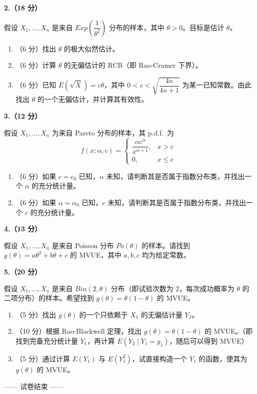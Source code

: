 \documentclass[12pt,a4paper]{ctexart}
\newcommand{\question}[1]{\bigskip\noindent\textbf{#1}\par\nobreak\medskip}
\begin{document}
\question{2.（18 分）}
假设 $X_{1},\ldots,X_{n}$ 是来自 $Exp\!\left(\dfrac{1}{\theta^{2}}\right)$ 分布的样本，其中 $\theta>0$。目标是估计 $\theta$。
\begin{enumerate}[label=(\arabic*),leftmargin=2.4em]
  \item （6 分）找出 $\theta$ 的极大似然估计。
  \item （6 分）计算 $\theta$ 的无偏估计的 RCB（即 Rao-Cramer 下界）。
  \item （6 分）已知 $E\!\left(\sqrt{\overline{X}}\right)=c\theta$，其中 $0<c<\sqrt{\dfrac{4n}{4n+1}}$ 为某一已知常数。由此找出 $\theta$ 的一个无偏估计，并计算其有效性。
\end{enumerate}

\question{3.（12 分）}
假设 $X_{1},\ldots,X_{n}$ 为来自 Pareto 分布的样本，其 p.d.f.\ 为
\[ f(x;\alpha,c)=\begin{cases} \dfrac{\alpha c^{\alpha}}{x^{\alpha+1}}, & x>c \\[2mm] 0, & x\le c \end{cases} \]
\begin{enumerate}[label=(\arabic*),leftmargin=2.4em]
  \item （6 分）如果 $c=c_{0}$ 已知，$\alpha$ 未知，请判断其是否属于指数分布类，并找出一个 $\alpha$ 的充分统计量。
  \item （6 分）如果 $\alpha=\alpha_{0}$ 已知，$c$ 未知，请判断其是否属于指数分布类，并找出一个 $c$ 的充分统计量。
\end{enumerate}

\question{4.（13 分）}
假设 $X_{1},\ldots,X_{n}$ 是来自 Poisson 分布 $Po(\theta)$ 的样本。请找到 $g(\theta)=a\theta^{2}+b\theta+c$ 的 MVUE，其中 $a,b,c$ 均为给定常数。

\question{5.（20 分）}
假设 $X_{1},\ldots,X_{n}$ 是来自 $Bin(2,\theta)$ 分布（即试验次数为 2，每次成功概率为 $\theta$ 的二项分布）的样本。希望找到 $g(\theta)=\theta(1-\theta)$ 的 MVUE。
\begin{enumerate}[label=(\arabic*),leftmargin=2.4em]
  \item （5 分）找出 $g(\theta)$ 的一个只依赖于 $X_{1}$ 的无偏估计量 $Y_{2}$。
  \item （10 分）根据 Rao-Blackwell 定理，找出 $g(\theta)=\theta(1-\theta)$ 的 MVUE。（即找到完备充分统计量 $Y_{1}$，再计算 $E(Y_{2}\mid Y_{1}=y_{1})$，随后可以得到 MVUE）
  \item （5 分）通过计算 $E(Y_{1})$ 与 $E(Y_{1}^{2})$，试直接构造一个 $Y_{1}$ 的函数，使其为 $g(\theta)$ 的 MVUE。
\end{enumerate}

\vfill
\begin{center}\small —— 试卷结束 ——\end{center}
\end{document}
